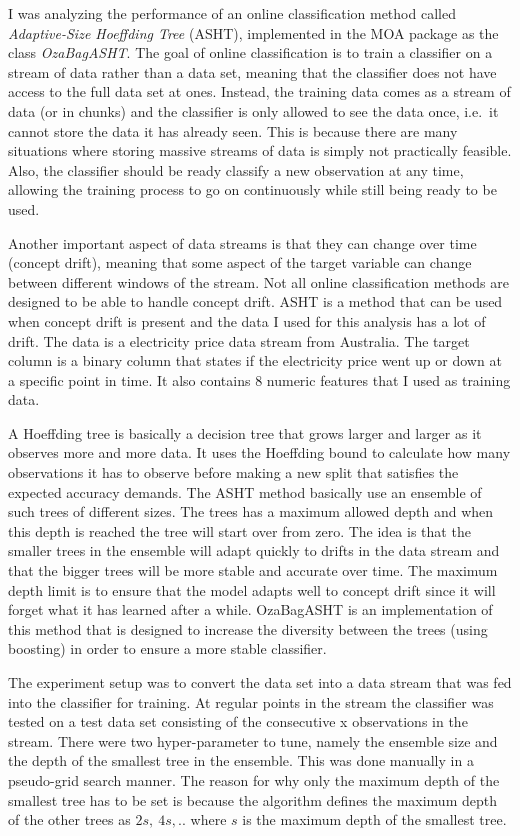 \documentclass[11pt,twoside,swedish]{article}
\begin{document}
I was analyzing the performance of an online classification method
called \emph{Adaptive-Size Hoeffding Tree} (ASHT), implemented in the
MOA package as the class \emph{OzaBagASHT}. The goal of online
classification is to train a classifier on a stream of data rather
than a data set, meaning that the classifier does not have access to
the full data set at ones. Instead, the training data comes as a
stream of data (or in chunks) and the classifier is only allowed to
see the data once, i.e.\ it cannot store the data it has already
seen. This is because there are many situations where storing massive
streams of data is simply not practically feasible. Also, the
classifier should be ready classify a new observation at any time,
allowing the training process to go on continuously while still being
ready to be used.

Another important aspect of data streams is that they
can change over time (concept drift), meaning that some aspect of the target variable
can change between different windows of the stream. Not all online
classification methods are designed to be able to handle concept
drift. ASHT is a method that can be used when concept drift is present
and the data I used for this analysis has a lot of drift. The data is
a electricity price data stream from Australia. The target column is a
binary column that states if the electricity price went up or down at
a specific point in time. It also contains 8 numeric features that I
used as training data.

A Hoeffding tree is basically a decision tree that grows larger and
larger as it observes more and more data. It uses the Hoeffding bound
to calculate how many observations it has to observe before making a
new split that satisfies the expected accuracy demands. The
ASHT method basically use an ensemble of such trees of different
sizes. The trees has a maximum allowed depth and when this depth is
reached the tree will start over from zero. The idea is that the
smaller trees in the ensemble will adapt quickly to drifts in the data
stream and that the bigger trees will be more stable and accurate over
time. The maximum depth limit is to ensure that the model adapts well
to concept drift since it will forget what it has learned after a
while. OzaBagASHT is an implementation of this method that is designed
to increase the diversity between the trees (using boosting) in order
to ensure a more stable classifier.

The experiment setup was to convert the data set into a data stream
that was fed into the classifier for training. At regular points
in the stream the classifier was tested on a test data set consisting
of the consecutive x observations in the stream. There were two
hyper-parameter to tune, namely the ensemble size and the depth of the
smallest tree in the ensemble. This was done manually in a pseudo-grid
search manner. The reason for why only the maximum depth of the
smallest tree has to be set is because the algorithm defines the
maximum depth of the other trees as $2s,~4s,..$ where $s$ is the
maximum depth of the smallest tree.
\end{document}
